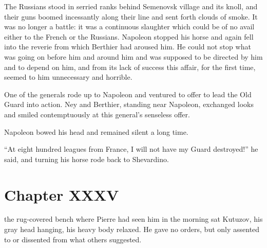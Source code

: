The Russians stood in serried ranks behind Semenovsk village and
its knoll, and their guns boomed incessantly along their line and
sent forth clouds of smoke. It was no longer a battle: it was a
continuous slaughter which could be of no avail either to the
French or the Russians. Napoleon stopped his horse and again fell
into the reverie from which Berthier had aroused him. He could
not stop what was going on before him and around him and was
supposed to be directed by him and to depend on him, and from its
lack of success this affair, for the first time, seemed to him
unnecessary and horrible.

One of the generals rode up to Napoleon and ventured to offer to
lead the Old Guard into action. Ney and Berthier, standing near
Napoleon, exchanged looks and smiled contemptuously at this
general's senseless offer.

Napoleon bowed his head and remained silent a long time.

``At eight hundred leagues from France, I will not have my Guard
destroyed!'' he said, and turning his horse rode back to
Shevardino.


\chapter*{Chapter XXXV} \ifaudio {}
\fi

 the rug-covered bench where Pierre had seen him in the morning
sat Kutuzov, his gray head hanging, his heavy body relaxed. He
gave no orders, but only assented to or dissented from what
others suggested.

